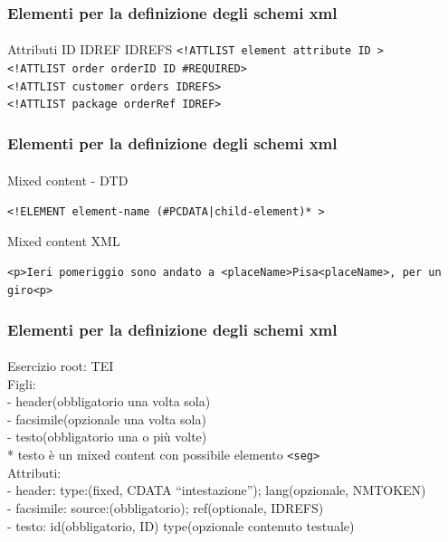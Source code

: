 \begin{frame}
    \frametitle{Elementi per la definizione degli schemi xml}
    \framesubtitle{}
    \addtocounter{nframe}{1}

    \begin{block}{Attributi ID IDREF IDREFS}
     \texttt{<!ATTLIST element attribute ID  >}
    \\\texttt{<!ATTLIST order orderID ID \#REQUIRED>}
    \\\texttt{<!ATTLIST customer orders IDREFS>}
    \\\texttt{<!ATTLIST package orderRef IDREF>}
    \end{block}
\end{frame}

\begin{frame}
    \frametitle{Elementi per la definizione degli schemi xml}
    \framesubtitle{}
    \addtocounter{nframe}{1}

    \begin{block}{Mixed content - DTD}
    \begin{center}\texttt{<!ELEMENT element-name (\#PCDATA|child-element)* >}\end{center}
    \end{block}

    \begin{block}{Mixed content XML}
    \begin{center}\texttt{<p>Ieri pomeriggio sono andato a <placeName>Pisa<placeName>, per un giro<p>}\end{center}
    \end{block}

\end{frame}


\begin{frame}
    \frametitle{Elementi per la definizione degli schemi xml}
    \framesubtitle{}
    \addtocounter{nframe}{1}

    \begin{block}{Esercizio}
        root: TEI
         \\Figli: 
         \\- header(obbligatorio una volta sola) 
         \\- facsimile(opzionale una volta sola) 
         \\- testo(obbligatorio una o più volte)
         \\ * testo è un mixed content con possibile elemento \texttt{<seg>} 
         \\Attributi: 
         \\- header: type:(fixed, CDATA ``intestazione''); lang(opzionale, NMTOKEN)
         \\- facsimile: source:(obbligatorio); ref(optionale, IDREFS)
         \\- testo: id(obbligatorio, ID) type(opzionale contenuto testuale)
    \end{block}
\end{frame}

